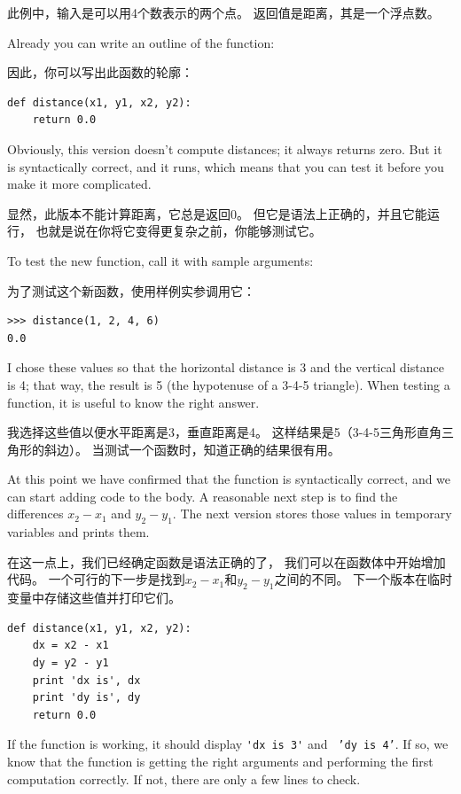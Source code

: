 \documentclass[10pt]{book}
\begin{document}
\begin{CJK}{UTF8}{gbsn}
此例中，输入是可以用4个数表示的两个点。
返回值是距离，其是一个浮点数。

Already you can write an outline of the function:

因此，你可以写出此函数的轮廓：

\begin{verbatim}
def distance(x1, y1, x2, y2):
    return 0.0
\end{verbatim}
%
Obviously, this version doesn't compute distances; it always returns
zero.  But it is syntactically correct, and it runs, which means that
you can test it before you make it more complicated.

显然，此版本不能计算距离，它总是返回0。
但它是语法上正确的，并且它能运行，
也就是说在你将它变得更复杂之前，你能够测试它。

To test the new function, call it with sample arguments:

为了测试这个新函数，使用样例实参调用它：

\begin{verbatim}
>>> distance(1, 2, 4, 6)
0.0
\end{verbatim}
%
I chose these values so that the horizontal distance is 3 and the
vertical distance is 4; that way, the result is 5
(the hypotenuse of a 3-4-5 triangle). When testing a function, it is
useful to know the right answer.

我选择这些值以便水平距离是3，垂直距离是4。
这样结果是5（3-4-5三角形直角三角形的斜边）。
当测试一个函数时，知道正确的结果很有用。

At this point we have confirmed that the function is syntactically
correct, and we can start adding code to the body.
A reasonable next step is to find the differences
$x_2 - x_1$ and $y_2 - y_1$.  The next version stores those values in
temporary variables and prints them.

在这一点上，我们已经确定函数是语法正确的了，
我们可以在函数体中开始增加代码。
一个可行的下一步是找到$x_2 - x_1$和$y_2 - y_1$之间的不同。
下一个版本在临时变量中存储这些值并打印它们。

\begin{verbatim}
def distance(x1, y1, x2, y2):
    dx = x2 - x1
    dy = y2 - y1
    print 'dx is', dx
    print 'dy is', dy
    return 0.0
\end{verbatim}
%
If the function is working, it should display \verb"'dx is 3'" and {\tt
'dy is 4'}.  If so, we know that the function is getting the right
arguments and performing the first computation correctly.  If not,
there are only a few lines to check.


\end{CJK}
\end{document}
